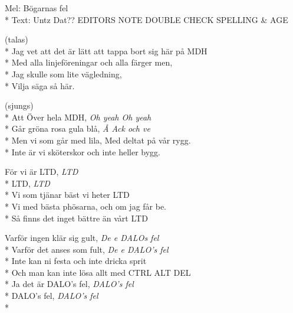 

\pagestyle{Föreningssånger}

\begin{SongText}
\begin{SongInfo}
Mel: Bögarnas fel\\*%
Text: Untz Dat?? EDITORS NOTE DOUBLE CHECK SPELLING & AGE
\end{SongInfo}
\begin{SongVerse}
    (talas)\\*%
    Jag vet att det är lätt att tappa bort sig här på MDH\\*%
    Med alla linjeföreningar och alla färger men, \\*%
    Jag skulle som lite vägledning, \\*%
    Vilja säga så här.
\end{SongVerse}
\begin{SongVerse}
    (sjungs)\\*%
    Att Över hela MDH, \textit{Oh yeah Oh yeah}\\*%
    Går gröna rosa gula blå, \textit{Å Ack och ve}\\*%
    Men vi som går med lila, Med deltat på vår rygg.\\*%
    Inte är vi sköterskor och inte heller bygg.
\end{SongVerse}
\begin{SongVerse}
    För vi är LTD, \textit{LTD}\\*%
    LTD, \textit{LTD}\\*%
    Vi som tjänar bäst vi heter LTD\\*%
    Vi med bästa phösarna, och om jag får be.\\*%
    Så finns det inget bättre än vårt LTD
\end{SongVerse}
\begin{SongVerse}
    Varför ingen klär sig gult, \textit{De e DALOs fel}\\*%
    Varför det anses som fult, \textit{De e DALO's fel}\\*%
    Inte kan ni festa och inte dricka sprit\\*%
    Och man kan inte lösa allt med CTRL ALT DEL\\*%
    Ja det är DALO's fel, \textit{DALO's fel} \\*%
    DALO's fel, \textit{DALO's fel}\\*%

\end{SongVerse}
\end{SongText}
